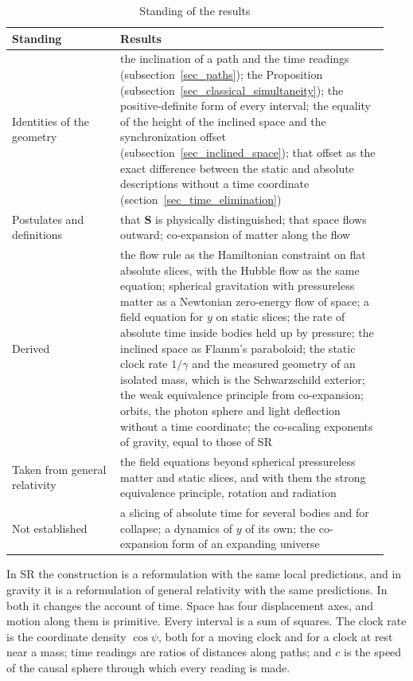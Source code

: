 \documentclass{iopjournal}
\begin{document}
\begin{table}[h]
\caption{Standing of the results}%
\label{table_status}
\begin{tabular}{@{}p{0.27\linewidth}p{0.67\linewidth}@{}}
\toprule
Standing & Results\\
\midrule
Identities of the geometry & the inclination of a path and the time readings (subsection~\ref{sec_paths}); the Proposition (subsection~\ref{sec_classical_simultaneity}); the positive-definite form of every interval; the equality of the height of the inclined space and the synchronization offset (subsection~\ref{sec_inclined_space}); that offset as the exact difference between the static and absolute descriptions without a time coordinate (section~\ref{sec_time_elimination})\\
Postulates and definitions & that $\mathbf{S}$ is physically distinguished; that space flows outward; co-expansion of matter along the flow\\
Derived & the flow rule as the Hamiltonian constraint on flat absolute slices, with the Hubble flow as the same equation; spherical gravitation with pressureless matter as a Newtonian zero-energy flow of space; a field equation for $y$ on static slices; the rate of absolute time inside bodies held up by pressure; the inclined space as Flamm's paraboloid; the static clock rate $1/\gamma$ and the measured geometry of an isolated mass, which is the Schwarzschild exterior; the weak equivalence principle from co-expansion; orbits, the photon sphere and light deflection without a time coordinate; the co-scaling exponents of gravity, equal to those of SR\\
Taken from general relativity & the field equations beyond spherical pressureless matter and static slices, and with them the strong equivalence principle, rotation and radiation\\
Not established & a slicing of absolute time for several bodies and for collapse; a dynamics of $y$ of its own; the co-expansion form of an expanding universe\\
\bottomrule
\end{tabular}
\end{table}

In SR the construction is a reformulation with the same local predictions, and in gravity it is a reformulation of general relativity with the same predictions. In both it changes the account of time. Space has four displacement axes, and motion along them is primitive. Every interval is a sum of squares. The clock rate is the coordinate density $\cos\psi$, both for a moving clock and for a clock at rest near a mass; time readings are ratios of distances along paths; and $c$ is the speed of the causal sphere through which every reading is made.
\end{document}
